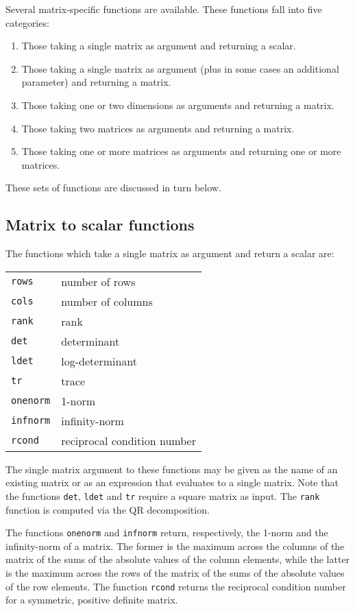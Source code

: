 Several matrix-specific functions are available.  These functions fall
into five categories:
%
\begin{enumerate}
\item Those taking a single matrix as argument and returning a scalar.
\item Those taking a single matrix as argument (plus in some cases an
  additional parameter) and returning a matrix.
\item Those taking one or two dimensions as arguments and
  returning a matrix.
\item Those taking two matrices as arguments and returning a matrix.
\item Those taking one or more matrices as arguments and returning one
  or more matrices.
\end{enumerate}
%
These sets of functions are discussed in turn below.

\subsection{Matrix to scalar functions}
\label{matrix-to-scalar}

The functions which take a single matrix as argument and return a
scalar are:

\begin{center}
\begin{tabular}{ll}
\texttt{rows} & number of rows \\
\texttt{cols} & number of columns \\
\texttt{rank} & rank \\
\texttt{det} & determinant \\
\texttt{ldet} & log-determinant \\
\texttt{tr} & trace \\
\texttt{onenorm} & 1-norm \\
\texttt{infnorm} & infinity-norm \\
\texttt{rcond} & reciprocal condition number
\end{tabular}
\end{center}

The single matrix argument to these functions may be given as the name
of an existing matrix or as an expression that evaluates to a single
matrix.  Note that the functions \texttt{det}, \texttt{ldet} and
\texttt{tr} require a square matrix as input.  The \texttt{rank}
function is computed via the QR decomposition.

The functions \texttt{onenorm} and \texttt{infnorm} return,
respectively, the 1-norm and the infinity-norm of a matrix.  The
former is the maximum across the columns of the matrix of the sums of
the absolute values of the column elements, while the latter is the
maximum across the rows of the matrix of the sums of the absolute
values of the row elements.  The function \texttt{rcond} returns the
reciprocal condition number for a symmetric, positive definite matrix.

